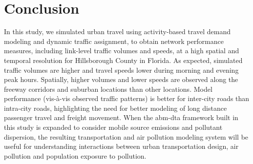 \section{Conclusion}
In this study, we simulated urban travel using activity-based travel demand modeling and dynamic traffic assignment, to obtain network performance measures, including link-level traffic volumes and speeds, at a high spatial and temporal resolution for Hillsborough County in Florida. 
As expected, simulated traffic volumes are higher and travel speeds lower during morning and evening peak hours. 
Spatially, higher volumes and lower speeds are observed along the freeway corridors and suburban locations than other locations. 
Model performance (vis-à-vis observed traffic patterns) is better for inter-city roads than intra-city roads, highlighting the need for better modeling of long distance passenger travel and freight movement. 
When the \gls{abm}-\gls{dta} framework built in this study is expanded to consider mobile source emissions and pollutant dispersion, the resulting transportation and air pollution modeling system will be useful for understanding interactions between urban transportation design, air pollution and population exposure to pollution.


